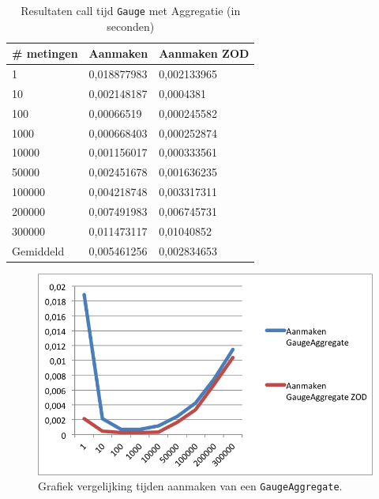 \clearpage
\begin{table}[]
\centering
\begin{tabular}{|l|l|l|}
\hline
\# metingen & Aanmaken    & Aanmaken ZOD \\ \hline
1           & 0,018877983 & 0,002133965  \\ \hline
10          & 0,002148187 & 0,0004381    \\ \hline
100         & 0,00066519  & 0,000245582  \\ \hline
1000        & 0,000668403 & 0,000252874  \\ \hline
10000       & 0,001156017 & 0,000333561  \\ \hline
50000       & 0,002451678 & 0,001636235  \\ \hline
100000      & 0,004218748 & 0,003317311  \\ \hline
200000      & 0,007491983 & 0,006745731  \\ \hline
300000      & 0,011473117 & 0,01040852   \\ \hline
Gemiddeld   & 0,005461256 & 0,002834653  \\ \hline
\end{tabular}
\caption{Resultaten call tijd \texttt{Gauge} met Aggregatie (in seconden)}
\label{Table:GaugeAggregate}
\end{table}
\begin{figure}[!h]
  \centering
  \includegraphics[scale=1.0]{Afbeeldingen/Evaluatie/AanmakenGaugeAggregate}
  \caption{Grafiek vergelijking tijden aanmaken van een \texttt{GaugeAggregate}.}
  \label{fig:GraphGaugeAggregate}
\end{figure}




